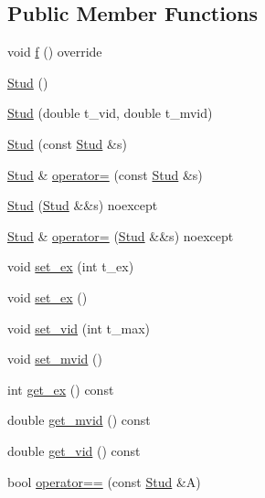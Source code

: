 \subsection*{Public Member Functions}
\begin{DoxyCompactItemize}
\item 
void \mbox{\hyperlink{class_stud_a6ebf0056208a353346da33a779763e4f}{f}} () override
\item 
\mbox{\hyperlink{class_stud_a97585839898d45dc9fc815d5b36e2b69}{Stud}} ()
\item 
\mbox{\hyperlink{class_stud_a5122947446a7abaaba3e6538faa43db1}{Stud}} (double t\+\_\+vid, double t\+\_\+mvid)
\item 
\mbox{\hyperlink{class_stud_a7115844e12dadad25b9ff2de597f9eac}{Stud}} (const \mbox{\hyperlink{class_stud}{Stud}} \&s)
\item 
\mbox{\hyperlink{class_stud}{Stud}} \& \mbox{\hyperlink{class_stud_a94d010cba4832e52eea069005bf7db04}{operator=}} (const \mbox{\hyperlink{class_stud}{Stud}} \&s)
\item 
\mbox{\hyperlink{class_stud_a0dc47589ff92661e3bb7ea2070a4fd7d}{Stud}} (\mbox{\hyperlink{class_stud}{Stud}} \&\&s) noexcept
\item 
\mbox{\hyperlink{class_stud}{Stud}} \& \mbox{\hyperlink{class_stud_af5458aac5c975c0b6e35a40fac81756d}{operator=}} (\mbox{\hyperlink{class_stud}{Stud}} \&\&s) noexcept
\item 
void \mbox{\hyperlink{class_stud_a5a781181ed2031623963880d294066f2}{set\+\_\+ex}} (int t\+\_\+ex)
\item 
void \mbox{\hyperlink{class_stud_a39a9a5b2fcf459c3e56396a418694e5c}{set\+\_\+ex}} ()
\item 
void \mbox{\hyperlink{class_stud_a05d3a2f528ab191cb5d029c361fac3b7}{set\+\_\+vid}} (int t\+\_\+max)
\item 
void \mbox{\hyperlink{class_stud_a7ed1b42af6ad111a12c7aa21f922a01b}{set\+\_\+mvid}} ()
\item 
int \mbox{\hyperlink{class_stud_ad9d3e3bdd3a203ea8d1a50f5fe850022}{get\+\_\+ex}} () const
\item 
double \mbox{\hyperlink{class_stud_af2dca7dde881ef1d7faa4fc25bd6fb8c}{get\+\_\+mvid}} () const
\item 
double \mbox{\hyperlink{class_stud_aa43897451b4f38e742d515fabb662f81}{get\+\_\+vid}} () const
\item 
bool \mbox{\hyperlink{class_stud_ab6f87c50382f7662173f363b012fd0b9}{operator==}} (const \mbox{\hyperlink{class_stud}{Stud}} \&A)
\item 

\end{DoxyCompactItemize}
